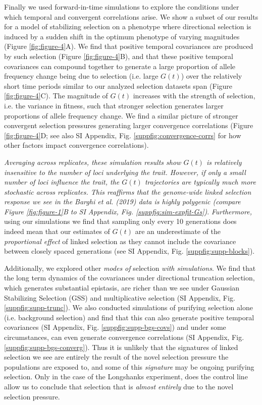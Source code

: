 \documentclass[9pt,twocolumn,twoside]{pnas-new}
\newcommand{\vb}[1]{{\it \color{red} #1}}
\begin{document}
Finally we used forward-in-time simulations to explore the conditions under
which temporal and convergent correlations arise. We show a subset of our
results for a model of stabilizing selection on a phenotype where directional
selection is induced by a sudden shift in the optimum phenotype of varying
magnitudes (Figure \ref{fig:figure-4}A). We find that positive temporal
covariances are produced by such selection (Figure \ref{fig:figure-4}B), and
that these positive temporal covariances can compound together to generate a
large proportion of allele frequency change being due to selection (i.e. large
$G(t)$) over the relatively short time periods similar to our analyzed
selection datasets span (Figure \ref{fig:figure-4}C).  The magnitude of
$G(t)$ increases with the strength of selection, i.e. the variance in
fitness, such that stronger selection generates larger proportions of allele
frequency change.  We find a similar picture of stronger convergent selection
pressures generating larger convergence correlations (Figure
\ref{fig:figure-4}D; see also SI Appendix, Fig.
\ref{suppfig:convergence-corrs} for how other factors impact convergence
correlations). 


\vb{Averaging across replicates, these simulation results show $G(t)$ is
  relatively insensitive to the number of loci underlying the trait. However,
  if only a small number of loci influence the trait, the $G(t)$ trajectories
  are typically much more stochastic \emph{across} replicates. This reaffirms
that the genome-wide linked selection response we see in the Barghi et al.
(2019) data is highly polygenic (compare Figure \ref{fig:figure-1}B to SI
Appendix, Fig.  \ref{suppfig:sim-expfit-Gs})}. \vb{Furthermore,} using our
simulations we find that sampling only every 10 generations does indeed mean
that our estimates of $G(t)$ are an underestimate of the \vb{proportional
effect} of linked selection as they cannot include the covariance
between closely spaced generations (see SI Appendix, Fig.
\ref{suppfig:supp-blocks}).

Additionally, we explored other \vb{modes of} selection \vb{with simulations}.
We find that the long term dynamics of the covariances under directional
truncation selection, which generates substantial epistasis, are richer than we
see under Gaussian Stabilizing Selection (GSS) and multiplicative selection (SI
Appendix, Fig.  \ref{suppfig:supp-trunc}). We also conducted simulations of
purifying selection alone (i.e. background selection) and find that this can
also generate positive temporal covariances (SI Appendix, Fig.
\ref{suppfig:supp-bgs-covs}) and under some circumstances, can even generate
convergence correlations (SI Appendix, Fig.  \ref{suppfig:supp-bgs-converg}).
Thus it is unlikely that the signatures of linked selection we see are entirely
the result of the novel selection pressure the populations are exposed to, and
some of this \vb{signature} may be ongoing purifying selection. Only in the
case of the Longshanks experiment, does the control line allow us to conclude
that selection that is \vb{almost entirely} due to the novel selection
pressure.
\end{document}

